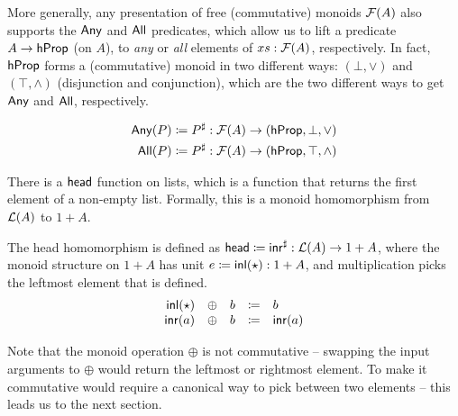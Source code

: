 More generally, any presentation of free (commutative) monoids $\mathcal{F}(A)$ also supports the
$\operatorname{\mathsf{Any}}$ and $\operatorname{\mathsf{All}}$ predicates, which allow us to lift a predicate $A \to \mathsf{hProp}$ (on $A$),
to \emph{any} or \emph{all} elements of $xs : \mathcal{F}(A)$, respectively.
%
In fact, $\mathsf{hProp}$ forms a (commutative) monoid in two different ways: $(\bot,\vee)$ and $(\top,\wedge)$
(disjunction and conjunction), which are the two different ways to get $\operatorname{\mathsf{Any}}$ and $\operatorname{\mathsf{All}}$, respectively.
\begin{definition}
      \label{def:any-all}
      \begin{align*}
            \mathsf{Any}(P) & \mathrel{\coloneq} {P}^{\sharp} : \mathcal{F}(A) \to (\mathsf{hProp}, \bot, \vee)   \\
            \mathsf{All}(P) & \mathrel{\coloneq} {P}^{\sharp} : \mathcal{F}(A) \to (\mathsf{hProp}, \top, \wedge)
      \end{align*}
\end{definition}

There is a $\operatorname{\mathsf{head}}$ function on lists, which is a function that returns the first element of a non-empty list.
%
Formally, this is a monoid homomorphism from $\mathcal{L}(A)$ to $1 + A$.

\begin{definition}
      \label{def:head-free-monoid}
      The head homomorphism is defined as
      \(
      \operatorname{\mathsf{head}} \mathrel{\coloneq} {\operatorname{\mathsf{inr}}}^{\sharp} : \mathcal{L}(A) \to 1 + A
      \),
      where the monoid structure on $1 + A$ has unit
      \(
      e \mathrel{\coloneq} \operatorname{\mathsf{inl}}(\star) : 1 + A
      \),
      and multiplication picks the leftmost element that is defined.
      \[
            \begin{array}{rclcl}
                  \operatorname{\mathsf{inl}}(\star) & \oplus & b & \mathrel{\coloneq} & b       \\
                  \operatorname{\mathsf{inr}}(a)    & \oplus & b & \mathrel{\coloneq} & \operatorname{\mathsf{inr}}(a) \\
            \end{array}
      \]
\end{definition}

Note that the monoid operation $\oplus$ is not commutative --
swapping the input arguments to $\oplus$ would return the leftmost or rightmost element.
%
To make it commutative would require a canonical way to pick between two elements --
this leads us to the next section.
